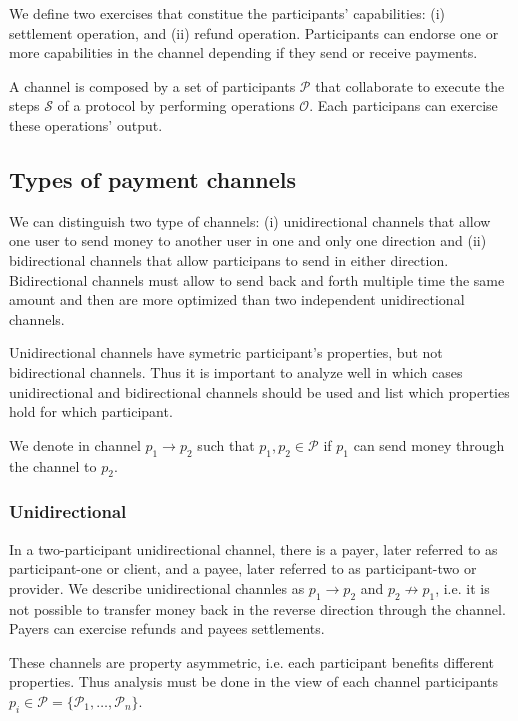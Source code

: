 \documentclass{llncs}
\begin{document}
We define two exercises that constitue the participants' capabilities: (i) settlement operation, and (ii) refund operation. Participants can endorse one or more capabilities in the channel depending if they send or receive payments.

\begin{definition}[Channel] A channel is composed by a set of participants $\mathcal{P}$ that collaborate to execute the steps $\mathcal{S}$ of a protocol by performing operations $\mathcal{O}$. Each participans can exercise these operations' output.
\end{definition}

\subsection{Types of payment channels}
We can distinguish two type of channels: (i) unidirectional channels that allow one user to send money to another user in one and only one direction and (ii) bidirectional channels that allow participans to send in either direction. Bidirectional channels must allow to send back and forth multiple time the same amount and then are more optimized than two independent unidirectional channels.

Unidirectional channels have symetric participant's properties, but not bidirectional channels. Thus it is important to analyze well in which cases unidirectional and bidirectional channels should be used and list which properties hold for which participant.

We denote in channel $p_1 \rightarrow p_2$ such that $p_1, p_2 \in \mathcal{P}$ if $p_1$ can send money through the channel to $p_2$.

\subsubsection{Unidirectional}
In a two-participant unidirectional channel, there is a payer, later referred to as participant-one or client, and a payee, later referred to as participant-two or provider. We describe unidirectional channles as $p_1 \rightarrow p_2$ and  $p_2 \not\rightarrow p_1$, i.e. it is not possible to transfer money back in the reverse direction through the channel. Payers can exercise refunds and payees settlements.

These channels are property asymmetric, i.e. each participant benefits different properties. Thus analysis must be done in the view of each channel participants $p_i \in \mathcal{P} = \{\mathcal{P}_1, \dots, \mathcal{P}_n\}$.
\end{document}
